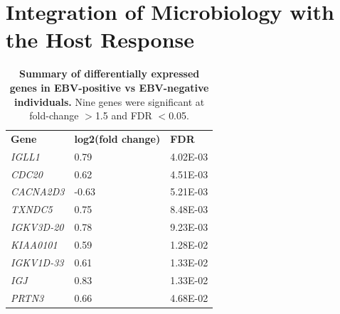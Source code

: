\chapter{Integration of Microbiology with the Host Response}\label{ch:AppResults3}

\begin{table}[]
\begin{center}
\begin{tabular}{lll}
\textbf{Gene}      & \textbf{log2(fold change)} & \textbf{FDR} \\
\textit{IGLL1}     & 0.79                       & 4.02E-03     \\
\textit{CDC20}     & 0.62                       & 4.51E-03     \\
\textit{CACNA2D3}  & -0.63                      & 5.21E-03     \\
\textit{TXNDC5}    & 0.75                       & 8.48E-03     \\
\textit{IGKV3D-20} & 0.78                       & 9.23E-03     \\
\textit{KIAA0101}  & 0.59                       & 1.28E-02     \\
\textit{IGKV1D-33} & 0.61                       & 1.33E-02     \\
\textit{IGJ}       & 0.83                       & 1.33E-02     \\
\textit{PRTN3}     & 0.66                       & 4.68E-02    
\end{tabular}
\end{center}
\caption[Differentially expressed genes in EBV reactivation]{\textbf{Summary of differentially expressed genes in EBV-positive vs EBV-negative individuals.} Nine genes were significant at fold-change $>$1.5 and FDR $<$0.05.} 
\label{tab:ebv-de-genes}
\end{table}

